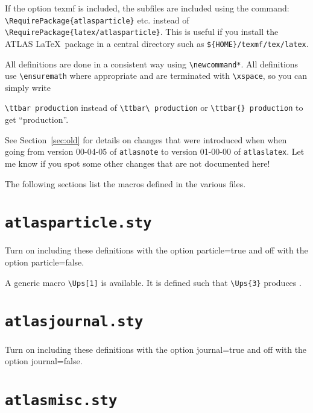 \documentclass[UKenglish,texlive=2013]{latex/atlasdoc}
\newcommand{\File}[1]{\texttt{#1}\xspace}
\newcommand{\Option}[1]{\textsf{#1}\xspace}
\newcommand{\Package}[1]{\texttt{#1}\xspace}
\begin{document}
If the  option \Option{texmf} is included, the subfiles are included using the command:
\verb|\RequirePackage{atlasparticle}| etc. instead of \verb|\RequirePackage{latex/atlasparticle}|.
This is useful if you install the ATLAS \LaTeX\ package in a central directory such as \File{\$\{HOME\}/texmf/tex/latex}.

All definitions are done in a consistent way using \verb|\newcommand*|.
All definitions use \verb|\ensuremath| where appropriate and are terminated with
\verb|\xspace|, so you can simply write {\verb|\ttbar production| instead of
\verb|\ttbar\ production| or \verb|\ttbar{} production| to get \enquote{\ttbar production}.

See Section~\ref{sec:old} for details on changes that were introduced when
when going from version 00-04-05 of \Package{atlasnote}
to version 01-00-00 of \Package{atlaslatex}.
Let me know if you spot some other changes that are not documented here!

The following sections list the macros defined in the various files.

\twocolumn
\section{\File{atlasparticle.sty}}

Turn on including these definitions with the option \Option{particle=true} and off with the option \Option{particle=false}.



A generic macro \verb|\Ups[1]| is available.
It is defined such that \verb|\Ups{3}| produces .


\newpage
\section{\File{atlasjournal.sty}}

Turn on including these definitions with the option \Option{journal=true} and off with the option \Option{journal=false}.




\newpage
\section{\File{atlasmisc.sty}}

}
\end{document}
